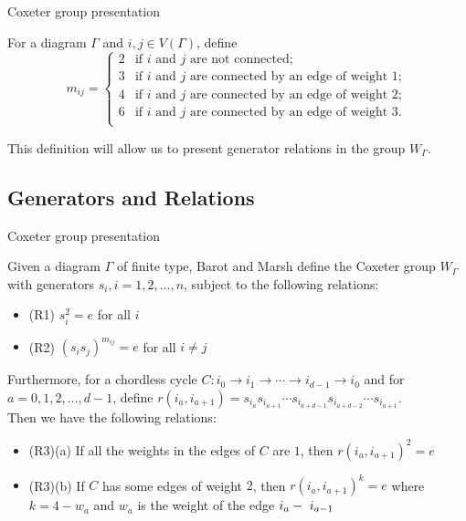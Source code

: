 \documentclass{beamer}
\begin{document}
\begin{frame}{Coxeter group presentation}
\begin{definition}
For a diagram $\Gamma$ and $i, j \in V(\Gamma)$, define 
\begin{displaymath}
m_{ij} = \begin{cases}    2 & \mbox{if } i \mbox{ and } j \mbox{ are not connected;} \\
						3 & \mbox{if } i \mbox{ and } j \mbox{ are connected by an edge of weight } 1;\\
						4 & \mbox{if } i \mbox{ and } j \mbox{ are connected by an edge of weight } 2;\\
						6 & \mbox{if } i \mbox{ and } j \mbox{ are connected by an edge of weight } 3.\\
					\end{cases}
\end{displaymath}	
\end{definition}

This definition will allow us to present generator relations in the group $W_{\Gamma}$.
\end{frame}

\subsection{Generators and Relations}

\begin{frame}{Coxeter group presentation}

Given a diagram $\Gamma$ of finite type, Barot and Marsh define the Coxeter group $W_{\Gamma}$ with generators $s_i, i = 1,2,\ldots, n$, subject to the following relations:
\begin{block}
   
\begin{itemize}
\item{\alert{(R1)}} $s_i^2 = e$ for all $i$
\item{\alert{(R2)}} $\left(s_is_j\right)^{m_{ij}} = e$ for all $i \neq j$
\end{itemize}

Furthermore, for a chordless cycle $C : i_0 \rightarrow i_1 \rightarrow \cdots \rightarrow i_{d-1} \rightarrow i_0$ and for $a = 0,1,2,\ldots, d-1$, define \textbf{$r\left(i_a, i_{a+1}\right) = s_{i_a}s_{i_{a+1}} \cdots s_{i_{a+d-1}}s_{i_{a+d-2}} \cdots s_{i_{a+1}}$}.\\

\vspace{0.1cm}
Then we have the following relations:
\begin{itemize}
\item{\alert{(R3)(a)}} If all the weights in the edges of $C$ are $1$, then $r(i_a, i_{a+1})^2 = e$
\item{\alert{(R3)(b)}} If $C$ has some edges of weight $2$, then $r(i_a, i_{a+1})^k = e$ where $k = 4-w_a$ and $w_a$ is the weight of the edge $i_a\--\ i_{a-1}$
\end{itemize}
\end{block}
\end{frame}
\end{document}
